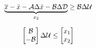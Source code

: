  \begin{equation}
     \underbrace{\overline{x}-\bar{x}-\CMcal{A}\Delta\hat{x}-\CMcal{B}\Delta\CMcal{D}}_{x_2}\geq \CMcal{B}\Delta\CMcal{U}
 \end{equation}


 \begin{equation}
        \begin{bmatrix}
           \CMcal{B}\\
           -\CMcal{B}
           \end{bmatrix}
           \Delta\CMcal{U}
           \leq 
           \begin{bmatrix}
         x_1\\
         x_2
           \end{bmatrix}
 \end{equation}

